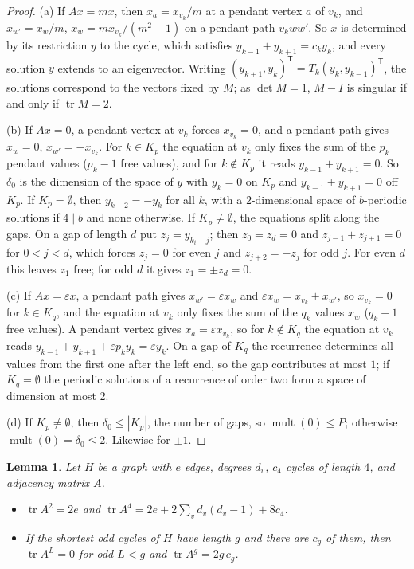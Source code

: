 \documentclass[11pt]{article}
\newtheorem{lemma}{Lemma}[section]
\theoremstyle{definition}
\theoremstyle{remark}
\DeclareMathOperator{\mult}{mult}
\DeclareMathOperator{\tr}{tr}
\begin{document}
\begin{proof}
(a) If $Ax=mx$, then $x_a=x_{v_k}/m$ at a pendant vertex $a$ of $v_k$, and
$x_{w'}=x_w/m$, $x_w=mx_{v_k}/(m^2-1)$ on a pendant path $v_kww'$. So $x$ is
determined by its restriction $y$ to the cycle, which satisfies
$y_{k-1}+y_{k+1}=c_ky_k$, and every solution $y$ extends to an eigenvector.
Writing $(y_{k+1},y_k)^{\mathsf T}=T_k(y_k,y_{k-1})^{\mathsf T}$, the solutions
correspond to the vectors fixed by $M$; as $\det M=1$, $M-I$ is singular if and
only if $\tr M=2$.

(b) If $Ax=0$, a pendant vertex at $v_k$ forces $x_{v_k}=0$, and a pendant
path gives $x_w=0$, $x_{w'}=-x_{v_k}$. For $k\in K_p$ the equation at $v_k$
only fixes the sum of the $p_k$ pendant values ($p_k-1$ free values), and for
$k\notin K_p$ it reads $y_{k-1}+y_{k+1}=0$. So $\delta_0$ is the dimension of
the space of $y$ with $y_k=0$ on $K_p$ and $y_{k-1}+y_{k+1}=0$ off $K_p$. If
$K_p=\emptyset$, then $y_{k+2}=-y_k$ for all $k$, with a $2$-dimensional space
of $b$-periodic solutions if $4\mid b$ and none otherwise. If
$K_p\ne\emptyset$, the equations split along the gaps. On a gap of length $d$
put $z_j=y_{k_i+j}$; then $z_0=z_d=0$ and $z_{j-1}+z_{j+1}=0$ for $0<j<d$,
which forces $z_j=0$ for even $j$ and $z_{j+2}=-z_j$ for odd $j$. For even $d$
this leaves $z_1$ free; for odd $d$ it gives $z_1=\pm z_d=0$.

(c) If $Ax=\varepsilon x$, a pendant path gives $x_{w'}=\varepsilon x_w$ and
$\varepsilon x_w=x_{v_k}+x_{w'}$, so $x_{v_k}=0$ for $k\in K_q$, and the equation
at $v_k$ only fixes the sum of the $q_k$ values $x_w$ ($q_k-1$ free values). A pendant vertex gives
$x_a=\varepsilon x_{v_k}$, so for $k\notin K_q$ the equation at $v_k$ reads
$y_{k-1}+y_{k+1}+\varepsilon p_ky_k=\varepsilon y_k$. On a gap of $K_q$ the
recurrence determines all values from the first one after the left end, so
the gap contributes at most $1$; if $K_q=\emptyset$ the periodic solutions of a
recurrence of order two form a space of dimension at most $2$.

(d) If $K_p\ne\emptyset$, then $\delta_0\le|K_p|$, the number of gaps, so
$\mult(0)\le P$; otherwise $\mult(0)=\delta_0\le2$. Likewise for $\pm1$.
\end{proof}

\begin{lemma}\label{lem:trace}
Let $H$ be a graph with $e$ edges, degrees $d_v$, $c_4$ cycles of length $4$,
and adjacency matrix $A$.
\begin{itemize}
\item[(a)] $\tr A^2=2e$ and $\tr A^4=2e+2\sum_vd_v(d_v-1)+8c_4$.
\item[(b)] If the shortest odd cycles of $H$ have length $g$ and there are
 $c_g$ of them, then $\tr A^L=0$ for odd $L<g$ and $\tr A^g=2g\,c_g$.
\end{itemize}
\end{lemma}
\end{document}
